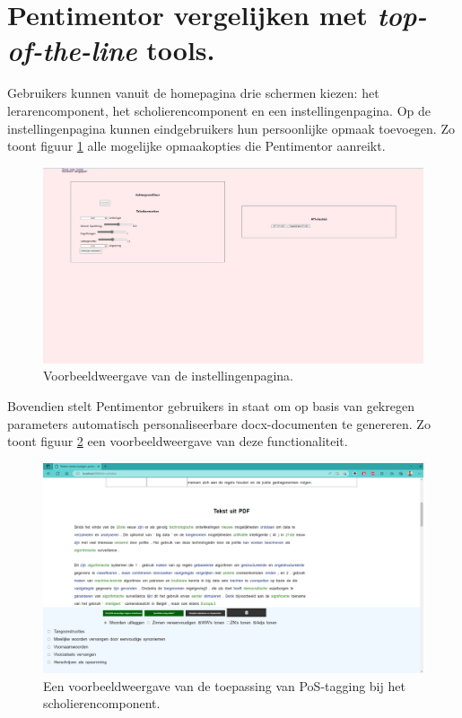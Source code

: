 \section{Pentimentor vergelijken met \textit{top-of-the-line} tools.}

Gebruikers kunnen vanuit de homepagina drie schermen kiezen: het lerarencomponent, het scholierencomponent en een instellingenpagina. Op de instellingenpagina kunnen eindgebruikers hun persoonlijke opmaak toevoegen. Zo toont figuur \ref{img:website-instellingen} alle mogelijke opmaakopties die Pentimentor aanreikt.

\begin{center}
	\begin{figure}[H]
		\includegraphics[width=\linewidth]{img/website-instellingen.png}
		\caption{Voorbeeldweergave van de instellingenpagina.}
		\label{img:website-instellingen}
	\end{figure}
\end{center}

Bovendien stelt Pentimentor gebruikers in staat om op basis van gekregen parameters automatisch personaliseerbare docx-documenten te genereren. Zo toont figuur \ref{img:proto-pos-tagging-scholieren} een voorbeeldweergave van deze functionaliteit.

\begin{center}
	\begin{figure}[H]
		\includegraphics[width=\linewidth]{img/proto-pos-tagging.png}
		\caption{Een voorbeeldweergave van de toepassing van PoS-tagging bij het scholierencomponent.}
		\label{img:proto-pos-tagging-scholieren}
	\end{figure}
\end{center}

